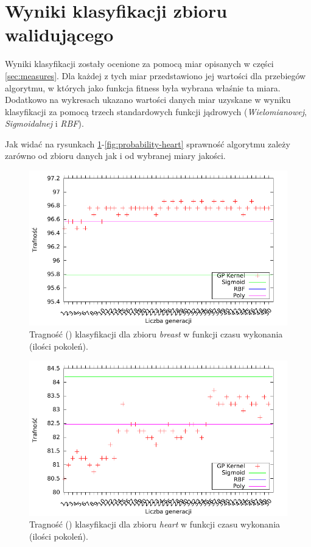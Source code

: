 	
\FloatBarrier
\section{Wyniki klasyfikacji zbioru walidującego}
	Wyniki klasyfikacji zostały ocenione za pomocą miar opisanych w części \ref{sec:measures}. Dla każdej z tych miar przedstawiono jej wartości dla przebiegów algorytmu, w których jako funkcja fitness była wybrana właśnie ta miara. Dodatkowo na wykresach ukazano wartości danych miar uzyskane w wyniku klasyfikacji za pomocą trzech standardowych funkcji jądrowych (\emph{Wielomianowej}, \emph{Sigmoidalnej} i \emph{RBF}).
	
	Jak widać na rysunkach \ref{fig:acc-breast}-\ref{fig:probability-heart} sprawność algorytmu zależy zarówno od zbioru danych jak i od wybranej miary jakości.
	
	\begin{figure}
		\includegraphics[scale=0.90]{figures/results/accuracy/accuracy-breast}
		\caption{Tragność () klasyfikacji dla zbioru \emph{breast} w funkcji czasu wykonania (ilości pokoleń).\label{fig:acc-breast}}
	\end{figure}
	
	\begin{figure}
		\includegraphics[scale=0.90]{figures/results/accuracy/accuracy-heart}
		\caption{Tragność () klasyfikacji dla zbioru \emph{heart} w funkcji czasu wykonania (ilości pokoleń).\label{fig:acc-heart}}
	\end{figure}
	
